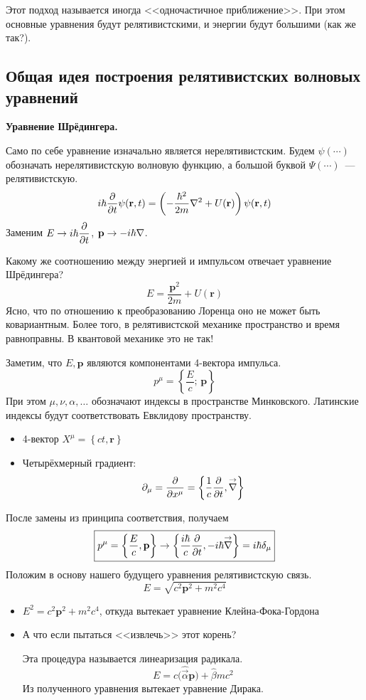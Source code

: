 Этот подход называется иногда <<одночастичное приближение>>. При этом основные уравнения будут релятивистскими, и энергии будут большими (как же так?).

\subsection{Общая идея построения релятивистских волновых уравнений}

\textbf{Уравнение Шрёдингера.}

Само по себе уравнение изначально является нерелятивистским. Будем $\psi(\cdots)$ обозначать нерелятивистскую волновую функцию, а большой буквой $\Psi(\cdots)$~--- релятивистскую.
\def \bf{\mathbf}
$$
    i \hbar \dfrac{\pd}{\pd t} \psi(\bf r, t) = \left(
        -\dfrac{\hbar^2}{2m} \nla^2 + U(\bf r)
    \right) \psi(\bf r, t)
$$ 
Заменим $E \to i \hbar \dfrac{\partial }{\partial t}$, $\bf p \to - i \hbar \nla$.

Какому же соотношению между энергией и импульсом отвечает уравнение Шрёдингера?
$$
    E = \dfrac{\bf p^2}{2m} + U(\bf r)
$$
Ясно, что по отношению к преобразованию Лоренца оно не может быть ковариантным. Более того, в релятивистской механике пространство и время равноправны. В квантовой механике это не так!

Заметим, что $E, \bf p$ являются компонентами 4-вектора импульса.
$$
    p^{\mu} = \left\{ \dfrac{E}{c}; \, \bf p \right\}
$$ 
При этом $\mu, \nu, \alpha, \ldots$ обозначают индексы в пространстве Минковского. Латинские индексы будут соответствовать Евклидову пространству.

\begin{itemize}
  \item 4-вектор $
    X^{\mu} = \left\{
        ct, \bf r
    \right\}
$
  \item Четырёхмерный градиент:
$$
    \partial_{\mu} = \dfrac{\partial}{\partial x^{\mu}} = \left\{
        \dfrac{1}{c} \dfrac{\partial}{\partial t}, \overset{\to}{\nabla}
    \right\}
$$
\end{itemize}

После замены из принципа соответствия, получаем
$$
    \boxed{
        p^{\mu} = \left\{
            \dfrac{E}{c}, \bf p
        \right\} \to
        \left\{
            \dfrac{i \hbar}{c} \dfrac{\pd}{\pd t}, -i \hbar \vec \nla
        \right\} = 
        i \hbar \dta_{\mu}
    }
$$
Положим в основу нашего будущего уравнения релятивистскую связь.
$$
\boxed{
    E = \sqrt{c^2 \bf p^2 + m^2 c^4}
    }
$$
\begin{itemize}
  \item $E^2 = c^2 \bf p^2 + m^2 c^4$, откуда вытекает уравнение Клейна-Фока-Гордона
  \item А что если пытаться <<извлечь>> этот корень?
  
  Эта процедура называется линеаризация радикала.
  $$
    E = c \big(
        \hat{\vec \alpha} \bf p
    \big) + \hat \beta m c^2
  $$
  Из полученного уравнения вытекает уравнение Дирака.
\end{itemize}

